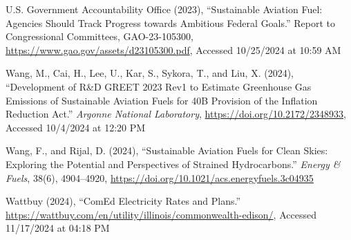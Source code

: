 \documentclass[12pt]{article}
\begin{document}
\begin{description}
    \item U.S. Government Accountability Office (2023), “Sustainable Aviation Fuel: Agencies Should Track Progress towards Ambitious Federal Goals.” Report to Congressional Committees, GAO-23-105300, \url{https://www.gao.gov/assets/d23105300.pdf}, Accessed 10/25/2024 at 10:59 AM
    
    \item Wang, M., Cai, H., Lee, U., Kar, S., Sykora, T., and Liu, X. (2024), “Development of R\&D GREET 2023 Rev1 to Estimate Greenhouse Gas Emissions of Sustainable Aviation Fuels for 40B Provision of the Inflation Reduction Act.” \textit{Argonne National Laboratory}, \url{https://doi.org/10.2172/2348933}, Accessed 10/4/2024 at 12:20 PM
    
    \item Wang, F., and Rijal, D. (2024), “Sustainable Aviation Fuels for Clean Skies: Exploring the Potential and Perspectives of Strained Hydrocarbons.” \textit{Energy \& Fuels}, 38(6), 4904–4920, \url{https://doi.org/10.1021/acs.energyfuels.3c04935}
    
    \item Wattbuy (2024), “ComEd Electricity Rates and Plans.” \url{https://wattbuy.com/en/utility/illinois/commonwealth-edison/}, Accessed 11/17/2024 at 04:18 PM
\end{description}
\end{document}
